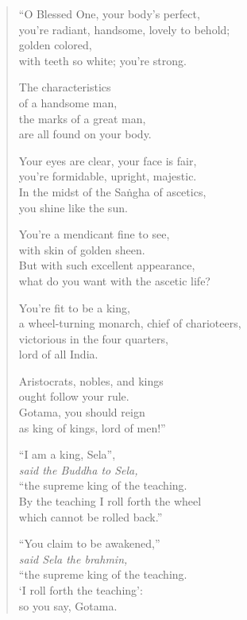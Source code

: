 \documentclass[12pt,openany]{book}%
\newcommand*{\scspeaker}[1]{\hspace{2em}\textit{#1}}
\begin{document}
\begin{verse}%
“O Blessed One, your body’s perfect, \\
you’re radiant, handsome, lovely to behold; \\
golden colored, \\
with teeth so white; you’re strong. 

The characteristics \\
of a handsome man, \\
the marks of a great man, \\
are all found on your body. 

Your eyes are clear, your face is fair, \\
you’re formidable, upright, majestic. \\
In the midst of the \textsanskrit{Saṅgha} of ascetics, \\
you shine like the sun. 

You’re a mendicant fine to see, \\
with skin of golden sheen. \\
But with such excellent appearance, \\
what do you want with the ascetic life? 

You’re fit to be a king, \\
a wheel-turning monarch, chief of charioteers, \\
victorious in the four quarters, \\
lord of all India. 

Aristocrats, nobles, and kings \\
ought follow your rule. \\
Gotama, you should reign \\
as king of kings, lord of men!” 

“I am a king, Sela”, \\
\scspeaker{said the Buddha to Sela, }\\
“the supreme king of the teaching. \\
By the teaching I roll forth the wheel \\
which cannot be rolled back.” 

“You claim to be awakened,” \\
\scspeaker{said Sela the brahmin, }\\
“the supreme king of the teaching. \\
‘I roll forth the teaching’: \\
so you say, Gotama. 


\end{verse}
\end{document}
